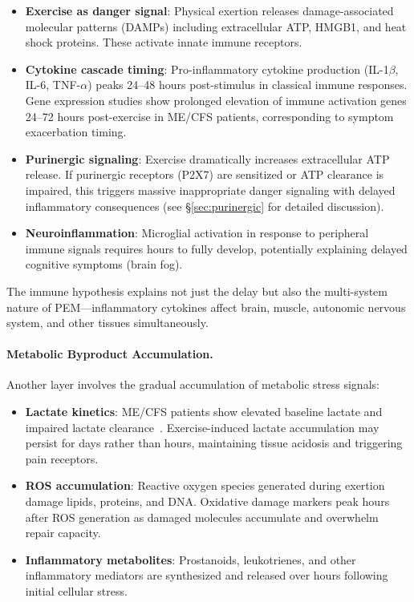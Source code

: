 \begin{itemize}
    \item \textbf{Exercise as danger signal}: Physical exertion releases damage-associated molecular patterns (DAMPs) including extracellular ATP, HMGB1, and heat shock proteins. These activate innate immune receptors.
    \item \textbf{Cytokine cascade timing}: Pro-inflammatory cytokine production (IL-1$\beta$, IL-6, TNF-$\alpha$) peaks 24--48 hours post-stimulus in classical immune responses. Gene expression studies show prolonged elevation of immune activation genes 24--72 hours post-exercise in ME/CFS patients, corresponding to symptom exacerbation timing.
    \item \textbf{Purinergic signaling}: Exercise dramatically increases extracellular ATP release. If purinergic receptors (P2X7) are sensitized or ATP clearance is impaired, this triggers massive inappropriate danger signaling with delayed inflammatory consequences (see \S\ref{sec:purinergic} for detailed discussion).
    \item \textbf{Neuroinflammation}: Microglial activation in response to peripheral immune signals requires hours to fully develop, potentially explaining delayed cognitive symptoms (brain fog).
\end{itemize}

The immune hypothesis explains not just the delay but also the multi-system nature of PEM---inflammatory cytokines affect brain, muscle, autonomic nervous system, and other tissues simultaneously.

\paragraph{Metabolic Byproduct Accumulation.}

Another layer involves the gradual accumulation of metabolic stress signals:

\begin{itemize}
    \item \textbf{Lactate kinetics}: ME/CFS patients show elevated baseline lactate and impaired lactate clearance~\cite{Lien2019lactate}. Exercise-induced lactate accumulation may persist for days rather than hours, maintaining tissue acidosis and triggering pain receptors.
    \item \textbf{ROS accumulation}: Reactive oxygen species generated during exertion damage lipids, proteins, and DNA. Oxidative damage markers peak hours after ROS generation as damaged molecules accumulate and overwhelm repair capacity.
    \item \textbf{Inflammatory metabolites}: Prostanoids, leukotrienes, and other inflammatory mediators are synthesized and released over hours following initial cellular stress.
\end{itemize}

